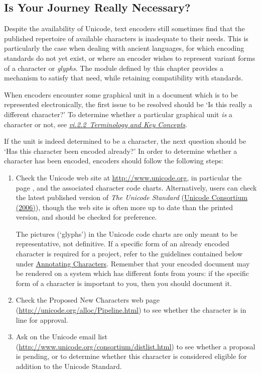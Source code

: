 \subsection[{Is Your Journey Really Necessary?}]{Is Your Journey Really Necessary?}\label{WDNE}\par
Despite the availability of Unicode, text encoders still sometimes find that the published repertoire of available characters is inadequate to their needs. This is particularly the case when dealing with ancient languages, for which encoding standards do not yet exist, or where an encoder wishes to represent variant forms of a character or \textit{glyphs}. The module defined by this chapter provides a mechanism to satisfy that need, while retaining compatibility with standards.\par
When encoders encounter some graphical unit in a document which is to be represented electronically, the first issue to be resolved should be ‘Is this really a different character?’ To determine whether a particular graphical unit \textit{is} a character or not, see \textit{\hyperref[D4-42]{vi.2.2\ Terminology and Key Concepts}}.\par
If the unit is indeed determined to be a character, the next question should be ‘Has this character been encoded already?’ In order to determine whether a character has been encoded, encoders should follow the following steps: \begin{enumerate}
\item \par
Check the Unicode web site at \url{http://www.unicode.org}, in particular the page , and the associated character code charts. Alternatively, users can check the latest published version of \textit{The Unicode Standard} (\hyperref[CH-BIBL-3]{Unicode Consortium (2006)}), though the web site is often more up to date than the printed version, and should be checked for preference. \par
The pictures (‘glyphs’) in the Unicode code charts are only meant to be representative, not definitive. If a specific form of an already encoded character is required for a project, refer to the guidelines contained below under \hyperref[D25-30]{Annotating Characters}. Remember that your encoded document may be rendered on a system which has different fonts from yours: if the specific form of a character is important to you, then you should document it.
\item Check the Proposed New Characters web page (\url{http://unicode.org/alloc/Pipeline.html}) to see whether the character is in line for approval.
\item Ask on the Unicode email list (\url{http://www.unicode.org/consortium/distlist.html}) to see whether a proposal is pending, or to determine whether this character is considered eligible for addition to the Unicode Standard.
\end{enumerate}\par

